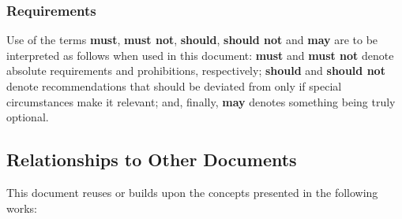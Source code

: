 \subsubsection{Requirements}

Use of the terms \textbf{must}, \textbf{must not}, \textbf{should}, \textbf{should not} and \textbf{may} are to be interpreted as follows when used in this document: \textbf{must} and \textbf{must not} denote absolute requirements and prohibitions, respectively; \textbf{should} and \textbf{should not} denote recommendations that should be deviated from only if special circumstances make it relevant; and, finally, \textbf{may} denotes something being truly optional.

\subsection{Relationships to Other Documents}
\label{sec:introduction:relationships}

This document reuses or builds upon the concepts presented in the following works:

